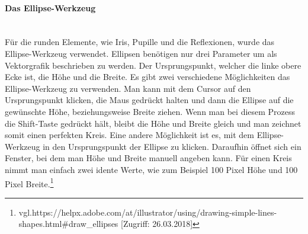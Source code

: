 \paragraph{Das Ellipse-Werkzeug}
\leavevmode \\
Für die runden Elemente, wie Iris, Pupille und die Reflexionen, wurde das Ellipse-Werkzeug verwendet. Ellipsen benötigen nur drei Parameter um als Vektorgrafik beschrieben zu werden. Der Ursprungspunkt, welcher die linke obere Ecke ist, die Höhe und die Breite. Es gibt zwei verschiedene Möglichkeiten das Ellipse-Werkzeug zu verwenden. Man kann mit dem Cursor auf den Ursprungspunkt klicken, die Maus gedrückt halten und dann die Ellipse auf die gewünschte Höhe, beziehungsweise Breite ziehen. Wenn man bei diesem Prozess die Shift-Taste gedrückt hält, bleibt die Höhe und Breite gleich und man zeichnet somit einen perfekten Kreis. Eine andere Möglichkeit ist es, mit dem Ellipse-Werkzeug in den Ursprungspunkt der Ellipse zu klicken. Daraufhin öffnet sich ein Fenster, bei dem man Höhe und Breite manuell angeben kann. Für einen Kreis nimmt man einfach zwei idente Werte, wie zum Beispiel 100 Pixel Höhe und 100 Pixel Breite.\footnote{\label{} vgl.https://helpx.adobe.com/at/illustrator/using/drawing-simple-lines-shapes.html\#draw\_ellipses [Zugriff: 26.03.2018]}
\leavevmode \\

